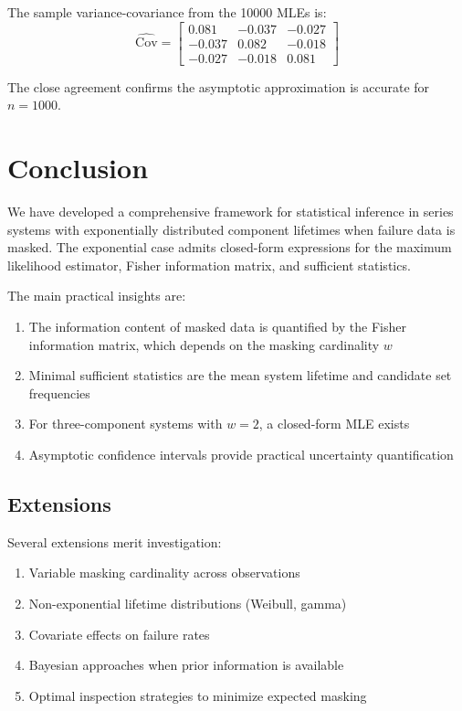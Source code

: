 \documentclass[12pt]{article}
\theoremstyle{definition}
\begin{document}
The sample variance-covariance from the 10000 MLEs is:
\begin{equation}
\widehat{\text{Cov}} = \begin{bmatrix}
0.081 & -0.037 & -0.027\\
-0.037 & 0.082 & -0.018\\
-0.027 & -0.018 & 0.081
\end{bmatrix}
\end{equation}

The close agreement confirms the asymptotic approximation is accurate for $n=1000$.

\section{Conclusion}
\label{sec:conclusion}

We have developed a comprehensive framework for statistical inference in series systems with exponentially distributed component lifetimes when failure data is masked. The exponential case admits closed-form expressions for the maximum likelihood estimator, Fisher information matrix, and sufficient statistics.

The main practical insights are:
\begin{enumerate}
\item The information content of masked data is quantified by the Fisher information matrix, which depends on the masking cardinality $w$
\item Minimal sufficient statistics are the mean system lifetime and candidate set frequencies
\item For three-component systems with $w=2$, a closed-form MLE exists
\item Asymptotic confidence intervals provide practical uncertainty quantification
\end{enumerate}

\subsection{Extensions}

Several extensions merit investigation:
\begin{enumerate}
\item Variable masking cardinality across observations
\item Non-exponential lifetime distributions (Weibull, gamma)
\item Covariate effects on failure rates
\item Bayesian approaches when prior information is available
\item Optimal inspection strategies to minimize expected masking
\end{enumerate}
\end{document}
